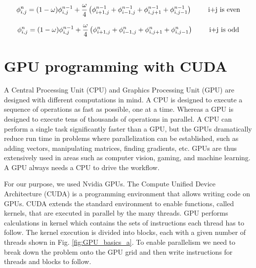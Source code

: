 \begin{equation}{\label{rb_e}}
 \phi_{i,j}^{n} = (1-\omega)\phi^{n-1}_{i,j} + \frac{\omega}{4} \left(\phi^{n-1}_{i+1,j} + \phi^{n-1}_{i-1,j} + \phi^{n-1}_{i,j+1} + \phi^{n-1}_{i,j-1} \right) \qquad \text{ i+j is even}
\end{equation}

\begin{equation}{\label{rb_o}}
 \phi_{i,j}^{n} = (1-\omega)\phi^{n-1}_{i,j} + \frac{\omega}{4} \left(\phi^{n}_{i+1,j} + \phi^n_{i-1,j} + \phi^{n}_{i,j+1} + \phi^n_{i,j-1} \right) \qquad \text{ i+j is odd}
\end{equation}

\section{GPU programming with CUDA {\cpp} }%

A Central Processing Unit (CPU) and Graphics Processing Unit (GPU) are designed with different computations in mind. A CPU is designed to execute a sequence of operations as fast as possible, one at a time. Whereas a GPU is designed to execute tens of thousands of operations in parallel. A CPU can perform a single task significantly faster than a GPU, but the GPUs dramatically reduce run time in problems where parallelization can be established, such as adding vectors, manipulating matrices, finding gradients, etc. GPUs are thus extensively used in areas such as computer vision, gaming, and machine learning. A GPU always needs a CPU to drive the workflow. 

For our purpose, we used Nvidia GPUs. The Compute Unified Device Architecture (CUDA) is a programming environment that allows writing {\cpp} code on GPUs. CUDA extends the standard {\cpp} environment to enable functions, called kernels, that are executed in parallel by the many threads. GPU performs calculations in kernel which contains the sets of instructions each thread has to follow. The kernel execution is divided into blocks, each with a given number of threads shown in Fig. \ref{fig:GPU_basics_a}. To enable parallelism we need to break down the problem onto the GPU grid and then write instructions for threads and blocks to follow.

